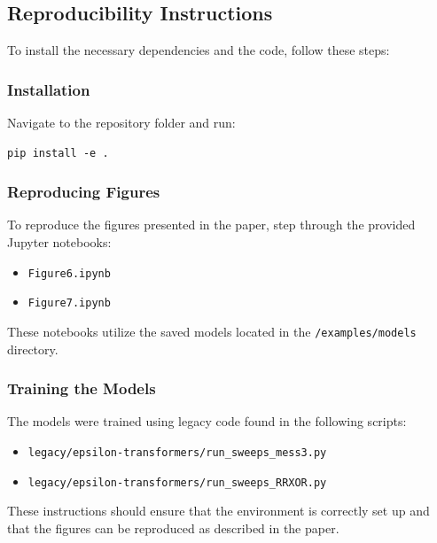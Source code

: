 \documentclass{article}
\begin{document}
\subsection{Reproducibility Instructions}

To install the necessary dependencies and the code, follow these steps:

\subsubsection{Installation}

Navigate to the repository folder and run:
\begin{verbatim}
pip install -e .
\end{verbatim}

\subsubsection{Reproducing Figures}

To reproduce the figures presented in the paper, step through the provided Jupyter notebooks:

\begin{itemize}
    \item \texttt{Figure6.ipynb}
    \item \texttt{Figure7.ipynb}
\end{itemize}

These notebooks utilize the saved models located in the \texttt{/examples/models} directory.

\subsubsection{Training the Models}

The models were trained using legacy code found in the following scripts:

\begin{itemize}
    \item \texttt{legacy/epsilon-transformers/run\_sweeps\_mess3.py}
    \item \texttt{legacy/epsilon-transformers/run\_sweeps\_RRXOR.py}
\end{itemize}

These instructions should ensure that the environment is correctly set up and that the figures can be reproduced as described in the paper.




\end{document}

